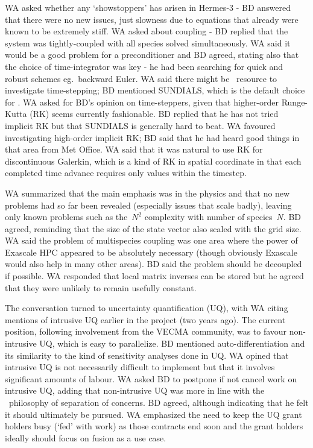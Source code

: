 WA asked whether any `showstoppers' has arisen in Hermes-3 - BD answered that 
there were no new issues, just slowness due to equations that already were 
known to be extremely stiff.  WA asked about coupling - BD replied that the 
system was tightly-coupled with all species solved simultaneously.  WA said it 
would be a good problem for a preconditioner and BD agreed, stating also that 
the choice of time-integrator was key - he had been searching for quick 
and robust schemes eg.\ backward Euler.  WA said there might be \nep\ resource to 
investigate time-stepping; BD mentioned SUNDIALS, which is the default choice 
for .  WA asked for BD's opinion on time-steppers, given that 
higher-order Runge-Kutta (RK) seems currently fashionable.  BD replied that he 
has not tried implicit RK but that SUNDIALS is generally hard to beat.  WA 
favoured investigating high-order implicit RK; BD said that he had heard good 
things in that area from Met Office.  WA said that it was natural to use RK for 
discontinuous Galerkin, which is a kind of RK in spatial coordinate in that 
each completed time advance requires only values within the timestep.

WA summarized that the main emphasis was in the physics and that no new 
problems had so far been revealed (especially issues that scale badly), leaving 
only known problems such as the~$N^2$ complexity with number of species~$N$.  
BD agreed, reminding that the size of the state vector also scaled 
with the grid size. 
WA said the problem of multispecies coupling was one area 
where the power of Exascale HPC appeared to be absolutely necessary (though 
obviously Exascale would also help in many other areas).  BD said the problem should be 
decoupled if possible.
WA responded that local matrix inverses can be stored
but he agreed that they were unlikely to remain usefully constant.

The conversation turned to uncertainty quantification (UQ), with WA citing 
mentions of intrusive UQ earlier in the project (two years ago).  The current 
position, following involvement from the VECMA community, was to favour 
non-intrusive UQ, which is easy to parallelize.  BD mentioned 
auto-differentiation and its similarity to the kind of sensitivity analyses 
done in UQ.  WA opined that intrusive UQ is not necessarily difficult to implement
but that it involves 
significant amounts of labour.  WA asked BD to postpone if not cancel work on intrusive UQ,
adding that non-intrusive UQ was more in line with 
the \nep \   philosophy of separation of concerns. BD agreed, although indicating that
he felt it should ultimately be pursued.  WA emphasized the need to 
keep the UQ grant holders busy (`fed' with work) as those contracts end soon 
and the grant holders ideally should focus on fusion as a use case.

